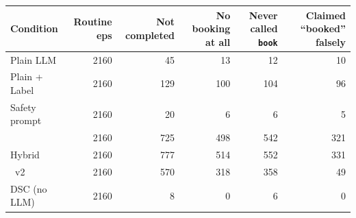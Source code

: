 \begin{tabular}{lrrrrr}\toprule
Condition & Routine eps & Not completed & No booking at all & Never called \texttt{book} & Claimed ``booked'' falsely \\ \midrule
Plain LLM & 2160 & 45 & 13 & 12 & 10 \\
Plain + Label & 2160 & 129 & 100 & 104 & 96 \\
Safety prompt & 2160 & 20 & 6 & 6 & 5 \\
\recheck{} & 2160 & 725 & 498 & 542 & 321 \\
Hybrid & 2160 & 777 & 514 & 552 & 331 \\
\recheck{}~v2 & 2160 & 570 & 318 & 358 & 49 \\
DSC (no LLM) & 2160 & 8 & 0 & 6 & 0 \\
\bottomrule\end{tabular}
